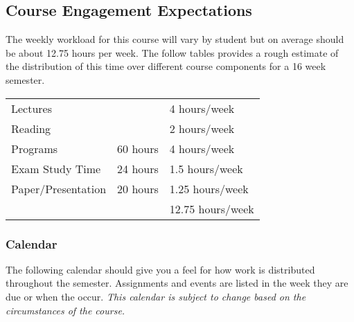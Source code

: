 \documentclass[]{tufte-handout}
\begin{document}
\subsection{Course Engagement Expectations}

The weekly workload for this course will vary by student but on average should be about 12.75 hours per week.  The follow tables provides a rough estimate of the distribution of this time over different course components for a 16 week semester.
\begin{center}
\begin{tabular}{lll}
\toprule
Lectures&           & 4 hours/week \\
Reading &           & 2 hours/week \\
Programs & 60 hours  & 4 hours/week \\
Exam Study Time & 24 hours  & 1.5 hours/week \\
Paper/Presentation & 20 hours & 1.25 hours/week \\
\midrule
& & 12.75 hours/week \\
\bottomrule
\end{tabular}
\end{center}


\subsubsection{Calendar}

The following calendar should give you a feel for how work is distributed throughout the semester.  Assignments and events are listed in the week they are due or when the occur. \textit{This calendar is subject to change based on the circumstances of the course.}
\end{document}
